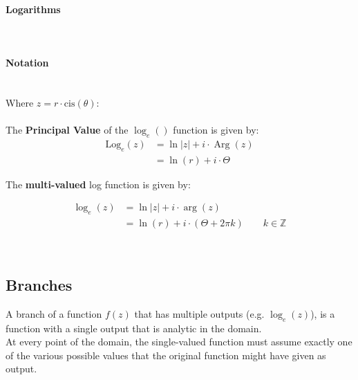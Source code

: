 \documentclass[class=article, crop=false]{standalone}
\begin{document}
    \paragraph{Logarithms}
    \ \

    \hfill\begin{minipage}{\dimexpr\textwidth-3cm}
    \begin{tcolorbox}

    \paragraph{Notation}\ \\
    Where $z =  r \cdot \mathrm{cis}{\left( \theta \right) }$:\\
    \ \\
    The \textbf{Principal Value} of the $\log_e{\left(  \right) }$ function is given by:
    \begin{align}
      \mathrm{Log}_e{\left( z \right) } &= \ln{     \left| z \right|  } +  i \cdot  \operatorname{Arg}\left( z \right) \\
      &= \ln{ \left( r \right)  } +  i \cdot \Theta
      \label{prinlogdef}
    \end{align}

    The \textbf{multi-valued} log function is given by:

    \begin{align}
      \log_e{\left( z \right) } &= \ln{     \left| z \right|  } +  i \cdot \operatorname{arg}\left( z \right) \\
      &= \ln{ \left( r \right)  } +  i \cdot \left( \Theta + 2\pi k \right) \qquad k \in \mathbb{Z}
      \label{mvlogfunc}
    \end{align}
   \end{tcolorbox}

    \end{minipage}
    \ \\


    \newpage



      \subsection{Branches}
      A branch of a function $f\left( z \right) $ that has multiple outputs  (e.g. $\log_e{\left( z \right) }$), is a function with a single output that is analytic in the domain. \\
At every point of the domain, the single-valued function must assume exactly one of the various possible values that the original function might have given as output.\\
\ \
\end{document}
